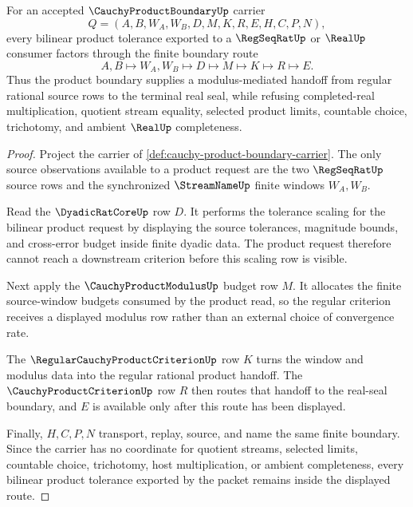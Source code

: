 \begin{theorem}
\label{thm:cauchy-product-boundary-bilinear-modulus}
For an accepted $\CauchyProductBoundaryUp$ carrier
$$
Q=(A,B,W_A,W_B,D,M,K,R,E,H,C,P,N),
$$
every bilinear product tolerance exported to a $\RegSeqRatUp$ or $\RealUp$ consumer factors through the finite boundary route
$$
A,B\longmapsto W_A,W_B\longmapsto D\longmapsto M\longmapsto K\longmapsto R\longmapsto E.
$$
Thus the product boundary supplies a modulus-mediated handoff from regular rational source rows to the terminal real seal, while refusing completed-real multiplication, quotient stream equality, selected product limits, countable choice, trichotomy, and ambient $\RealUp$ completeness.
\end{theorem}
\begin{proof}
Project the carrier of \autoref{def:cauchy-product-boundary-carrier}. The only source observations available to a product request are the two $\RegSeqRatUp$ source rows and the synchronized $\StreamNameUp$ finite windows $W_A,W_B$.

Read the $\DyadicRatCoreUp$ row $D$. It performs the tolerance scaling for the bilinear product request by displaying the source tolerances, magnitude bounds, and cross-error budget inside finite dyadic data. The product request therefore cannot reach a downstream criterion before this scaling row is visible.

Next apply the $\CauchyProductModulusUp$ budget row $M$. It allocates the finite source-window budgets consumed by the product read, so the regular criterion receives a displayed modulus row rather than an external choice of convergence rate.

The $\RegularCauchyProductCriterionUp$ row $K$ turns the window and modulus data into the regular rational product handoff. The $\CauchyProductCriterionUp$ row $R$ then routes that handoff to the real-seal boundary, and $E$ is available only after this route has been displayed.

Finally, $H,C,P,N$ transport, replay, source, and name the same finite boundary. Since the carrier has no coordinate for quotient streams, selected limits, countable choice, trichotomy, host multiplication, or ambient completeness, every bilinear product tolerance exported by the packet remains inside the displayed route.
\end{proof}


